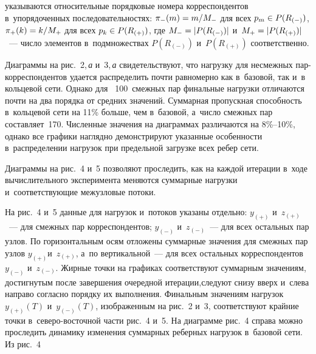 \begin{multicols}{2}

\noindent
 указываются относительные 
порядковые номера корреспондентов в~упорядоченных последовательностях:
$\pi_-(m) \hm= {m}/{M_-}$ для всех  $p_m \hm\in P(R_{(-)})$, 
$\pi_+(k) \hm= {k}/{M_+}$ для всех $p_k\hm \in P(R_{(+)})$,
где $M_- \hm= |P(R_{(-)})|$ и~$M_+ \hm= |P(R_{(+)})|$~---
число элементов в~подмножествах $P(R_{(-)})$ и~$P(R_{(+)})$ со\-от\-вет\-ст\-венно.

Диаграммы на рис.~2,\,\textit{а} и~3,\,\textit{а} свидетельствуют, что нагрузку   для несмежных 
пар-кор\-рес\-пон\-ден\-тов удается распределить почти равномерно как в~базовой, так 
и~в кольцевой сети. Однако для~ 100~смежных пар финальные нагрузки отличаются 
почти на два порядка от средних значений. Суммарная пропускная спо\-соб\-ность 
в~кольцевой сети на 11\% больше, чем в~базовой, а~чис\-ло смежных пар 
со\-став\-ля\-ет~170. Чис\-лен\-ные значения на диаграммах различаются на 8\%--10\%, 
однако все графики на\-гляд\-но демонстрируют указанные   особенности  
в~распределении   нагрузок при предельной загрузке всех ребер сети.

Диаграммы на рис.~4 и~5  позволяют проследить, как на каждой  итерации в~ходе 
вычислительного эксперимента меняются суммарные  нагрузки и~соответствующие 
межузловые потоки.  

На рис.~4 и~5 данные для нагрузок и~потоков указаны 
отдельно:
$y_{(+)}$ и~$z_{(+)}$~--- для  смежных пар корреспондентов;
$y_{(-)}$ и~$z_{(-)}$~--- для всех  остальных  пар узлов.
По горизонтальным осям отложены суммарные значения для смежных пар узлов 
$y_{(+)}$\linebreak и~$z_{(+)}$, а~по вертикальной~--- для  всех остальных 
корреспондентов $y_{(-)}$ 
и~$z_{(-)}$. Жирные точки на графиках соответствуют суммарным значениям, 
достигнутым после завершения очередной итерации,\linebreak следуют снизу вверх и~слева 
направо согласно порядку их выполнения. Финальным значениям нагрузок 
$y_{(+)}(T)$ и~$y_{(-)}(T)$, изображенным на рис.~2 и~3, соответствуют 
крайние точки в~се\-ве\-ро-вос\-точ\-ной части рис.~4 и~5.  На диаграмме рис.~4 
справа можно проследить динамику изменения суммарных реберных нагрузок 
в~базовой сети.  Из рис.~4\linebreak\vspace*{-12pt}

\pagebreak

\end{multicols}

